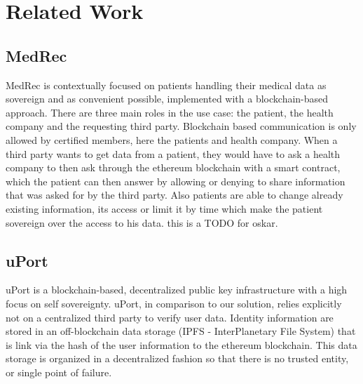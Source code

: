 \chapter{Related Work}
\label{cha:relatedwork}

\section{MedRec}

MedRec is contextually focused on patients handling their medical data as sovereign and as convenient possible,
implemented with a blockchain-based approach.
There are three main roles in the use case: the patient, the health company and the requesting third party.
Blockchain based communication is only allowed by certified members, here the patients and health company.
When a third party wants to get data from a patient, they would have to ask a health company to then ask through the
ethereum blockchain with a smart contract, which the patient can then answer by allowing or denying to share
information that was asked for by the third party.
Also patients are able to change already existing information, its access or limit it by time which make the patient
sovereign over the access to his data.
this is a TODO for oskar.

\section{uPort}
uPort is a blockchain-based, decentralized public key infrastructure with a high focus on self sovereignty. uPort, in comparison to our solution, relies explicitly not on a centralized third party to verify user data.\cite[p. 2]{uPortWhitePaper}
Identity information are stored in an off-blockchain data storage (IPFS - InterPlanetary File System) that is link via the hash of the user information to the ethereum blockchain. This data storage is organized in a decentralized fashion so that there is no trusted entity, or single point of failure. 

